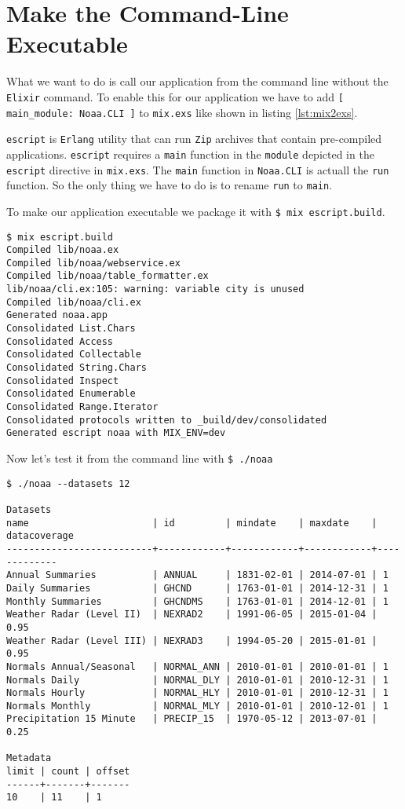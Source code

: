 \documentclass[10pt, a4paper]{article}
\newcommand{\includecode}[3]{}
\begin{document}
\section{Make the Command-Line Executable}
What we want to do is call our application from the command line without the
\texttt{Elixir} command. To enable this for our application we have to add
\texttt{[ main\_module: Noaa.CLI ]} to \texttt{mix.exs} like shown in 
listing \ref{lst:mix2exs}.

\includecode{mix.exs}{lst:mix2exs}{listings/mix2.exs}

\texttt{escript} is \texttt{Erlang} utility that can run \texttt{Zip} 
archives that contain pre-compiled applications. \texttt{escript} requires
a \texttt{main} function in the \texttt{module} depicted in the 
\texttt{escript} directive in \texttt{mix.exs}. The \texttt{main} function
in \texttt{Noaa.CLI} is actuall the \texttt{run} function. So the only thing
we have to do is to rename \texttt{run} to \texttt{main}.

\includecode{lib/noaa/cli.ex}{lst:cli8}{listings/cli8.ex}

To make our application executable we package it with 
\texttt{\$ mix escript.build}.
    
\begin{verbatim}
$ mix escript.build
Compiled lib/noaa.ex
Compiled lib/noaa/webservice.ex
Compiled lib/noaa/table_formatter.ex
lib/noaa/cli.ex:105: warning: variable city is unused
Compiled lib/noaa/cli.ex
Generated noaa.app
Consolidated List.Chars
Consolidated Access
Consolidated Collectable
Consolidated String.Chars
Consolidated Inspect
Consolidated Enumerable
Consolidated Range.Iterator
Consolidated protocols written to _build/dev/consolidated
Generated escript noaa with MIX_ENV=dev
\end{verbatim}

Now let's test it from the command line with \texttt{\$ ./noaa}

\begin{verbatim}
$ ./noaa --datasets 12

Datasets
name                      | id         | mindate    | maxdate    | datacoverage
--------------------------+------------+------------+------------+-------------
Annual Summaries          | ANNUAL     | 1831-02-01 | 2014-07-01 | 1        
Daily Summaries           | GHCND      | 1763-01-01 | 2014-12-31 | 1        
Monthly Summaries         | GHCNDMS    | 1763-01-01 | 2014-12-01 | 1        
Weather Radar (Level II)  | NEXRAD2    | 1991-06-05 | 2015-01-04 | 0.95     
Weather Radar (Level III) | NEXRAD3    | 1994-05-20 | 2015-01-01 | 0.95     
Normals Annual/Seasonal   | NORMAL_ANN | 2010-01-01 | 2010-01-01 | 1        
Normals Daily             | NORMAL_DLY | 2010-01-01 | 2010-12-31 | 1        
Normals Hourly            | NORMAL_HLY | 2010-01-01 | 2010-12-31 | 1        
Normals Monthly           | NORMAL_MLY | 2010-01-01 | 2010-12-01 | 1        
Precipitation 15 Minute   | PRECIP_15  | 1970-05-12 | 2013-07-01 | 0.25     
                                                                            
Metadata
limit | count | offset
------+-------+-------
10    | 11    | 1     
\end{verbatim}
\end{document}
